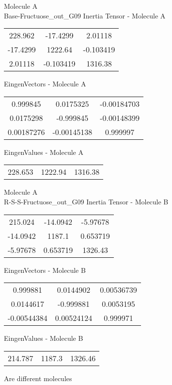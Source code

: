 \newpage
\begin{multicols}{2}
\begin{center}
Molecule A \\ 
Base-Fructuose_out_G09
Inertia Tensor - Molecule A \\
\vtab
\begin{tabular}{|c c c|}
228.962	 & 	-17.4299	 & 	2.01118	 \\
-17.4299	 & 	1222.64	 & 	-0.103419	 \\
2.01118	 & 	-0.103419	 & 	1316.38
\end{tabular}

\vtab
 EingenVectors - Molecule A     \\
\vtab
\begin{tabular}{|c c c|}
0.999845	 & 	0.0175325	 & 	-0.00184703	 \\
0.0175298	 & 	-0.999845	 & 	-0.00148399	 \\
0.00187276	 & 	-0.00145138	 & 	0.999997
\end{tabular}

\vtab
 EingenValues - Molecule A     \\
\vtab
\begin{tabular}{|c c c|}
228.653	 & 	1222.94	 & 	1316.38
\end{tabular}
\columnbreak
Molecule A \\ 
R-S-S-Fructuose_out_G09
Inertia Tensor - Molecule B \\
\vtab
\begin{tabular}{|c c c|}
215.024	 & 	-14.0942	 & 	-5.97678	 \\
-14.0942	 & 	1187.1	 & 	0.653719	 \\
-5.97678	 & 	0.653719	 & 	1326.43
\end{tabular}

\vtab
 EingenVectors - Molecule B     \\
\vtab
\begin{tabular}{|c c c|}
0.999881	 & 	0.0144902	 & 	0.00536739	 \\
0.0144617	 & 	-0.999881	 & 	0.0053195	 \\
-0.00544384	 & 	0.00524124	 & 	0.999971
\end{tabular}

\vtab
 EingenValues - Molecule B     \\
\vtab
\begin{tabular}{|c c c|}
214.787	 & 	1187.3	 & 	1326.46
\end{tabular}
\textcolor{NavyBlue}{\large Are different molecules}
\end{center}
\end{multicols}
